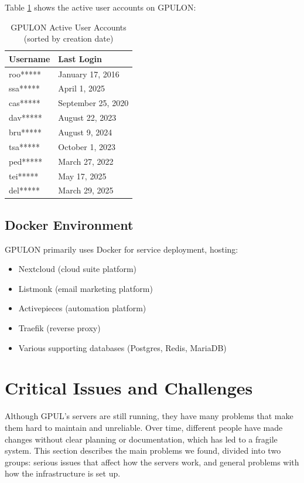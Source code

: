 Table \ref{tab:gpulon_users} shows the active user accounts on GPULON:

\begin{table}[H]
  \centering
  \caption{GPULON Active User Accounts (sorted by creation date)}
  \label{tab:gpulon_users}
  \begin{tabular}{ll}
    \rowcolor{udcpink!25}
    \textbf{Username} & \textbf{Last Login} \\
    \hline
    roo***** & January 17, 2016 \\
    ssa***** & April 1, 2025 \\
    cas***** & September 25, 2020 \\
    dav***** & August 22, 2023 \\
    bru***** & August 9, 2024 \\
    tsa***** & October 1, 2023 \\
    ped***** & March 27, 2022 \\
    tei***** & May 17, 2025 \\
    del***** & March 29, 2025 \\
  \end{tabular}
\end{table}

\subsection*{Docker Environment}

GPULON primarily uses Docker for service deployment, hosting:
\begin{itemize}
  \item Nextcloud (cloud suite platform)
  \item Listmonk (email marketing platform)
  \item Activepieces (automation platform)
  \item Traefik (reverse proxy)
  \item Various supporting databases (Postgres, Redis, MariaDB)
\end{itemize}

\section{Critical Issues and Challenges}

Although GPUL's servers are still running, they have many problems that make them hard to maintain and unreliable. Over time, different people have made changes without clear planning or documentation, which has led to a fragile system. This section describes the main problems we found, divided into two groups: serious issues that affect how the servers work, and general problems with how the infrastructure is set up.

